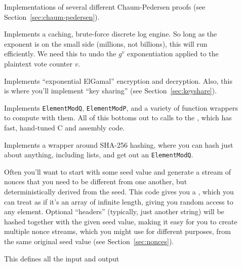 \begin{description}
\item[]
  Implementations of several different Chaum-Pedersen proofs
  (see Section~\ref{sec:chaum-pedersen}).
\item [] Implements a caching, brute-force discrete log engine.
  So long as the exponent is on the small side (millions, not
  billions), this will run efficiently. We need this to undo the
  $g^v$ exponentiation applied to the plaintext vote counter $v$.
\item [] Implements ``exponential ElGamal'' encryption and
  decryption. Also, this is where you'll implement ``key sharing''
  (see Section~\ref{sec:keyshare}).
\item [] Implements {\tt ElementModQ}, {\tt ElementModP}, and
  a variety of function wrappers to compute with them. All of this
  bottoms out to calls to the , which has
  fast, hand-tuned C and assembly code.
\item [] Implements a wrapper around SHA-256 hashing, where
  you can hash just about anything, including lists, and get out
  an {\tt ElementModQ}.
\item [] Often you'll want to start with some seed value
  and generate a stream of nonces that you need to be different from
  one another, but deterministically derived from the seed. This code
  gives you a , which you can treat as if it's
  an array of infinite length, giving you random access to any element.
  Optional ``headers'' (typically, just another string) will be hashed
  together with the given seed value, making it easy for you to create
  multiple nonce streams, which you might use for different purposes,
  from the same original seed value (see Section~\ref{sec:nonces}).
\item
  [] This defines all the input and output

\end{description}
